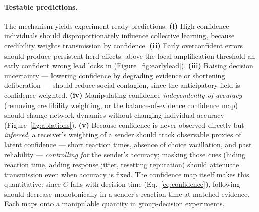 \documentclass[11pt]{article}
\newcommand{\1}{\mathbf{1}}
\begin{document}
\paragraph{Testable predictions.}
The mechanism yields experiment-ready predictions. \textbf{(i)} High-confidence
individuals should disproportionately influence collective learning, because
credibility weights transmission by confidence. \textbf{(ii)} Early overconfident
errors should produce persistent herd effects: above the local amplification
threshold an early confident wrong lead locks in
(Figure~\ref{fig:earlylead}). \textbf{(iii)} Raising decision uncertainty ---
lowering confidence by degrading evidence or shortening deliberation --- should
reduce social contagion, since the anticipatory field is confidence-weighted.
\textbf{(iv)} Manipulating confidence \emph{independently of accuracy} (removing
credibility weighting, or the balance-of-evidence confidence map) should change
network dynamics without changing individual accuracy
(Figure~\ref{fig:ablations}). \textbf{(v)} Because confidence is never observed
directly but \emph{inferred}, a receiver's weighting of a sender should track
observable proxies of latent confidence --- short reaction times, absence of
choice vacillation, and past reliability --- \emph{controlling for} the sender's
accuracy; masking those cues (hiding reaction time, adding response jitter,
resetting reputation) should attenuate transmission even when accuracy is fixed.
The confidence map itself makes this quantitative: since $C$ falls with decision
time (Eq.~\ref{eq:confidence}), following should decrease monotonically in a
sender's reaction time at matched evidence. Each maps onto a manipulable quantity
in group-decision experiments.
\end{document}
